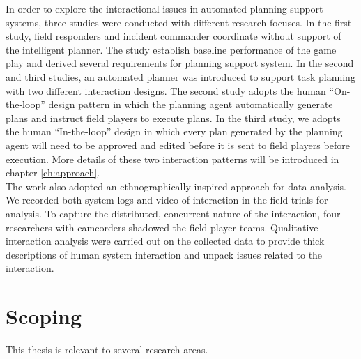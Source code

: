 In order to explore the interactional issues in automated planning support systems, three studies were conducted with different research focuses. In the first study, field responders and incident commander coordinate without support of the intelligent planner. The study establish baseline performance of the game play and derived several requirements for planning support system. In the second and third studies, an automated planner was introduced to support task planning with two different interaction designs. The second study adopts the human ``On-the-loop'' design pattern in which the planning agent automatically generate plans and instruct field players to execute plans. In the third study, we adopts the human ``In-the-loop'' design in which every plan generated by the planning agent will need to be approved and edited before it is sent to field players before execution. More details of these two interaction patterns will be introduced in chapter \ref{ch:approach}.\\

The work also adopted an ethnographically-inspired approach for data analysis. We recorded both system logs and video of interaction in the field trials for analysis. To capture the distributed, concurrent nature of the interaction, four researchers with camcorders shadowed the field player teams. Qualitative interaction analysis were carried out on the collected data to provide thick descriptions of human system interaction and unpack issues related to the interaction.\\


\section{Scoping}\label{sec:custom}
This thesis is relevant to several research areas. \\

